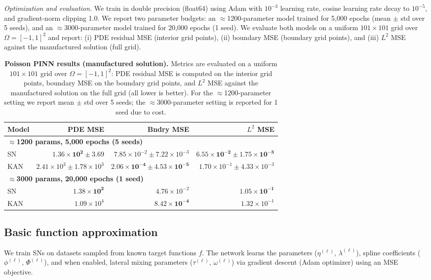 \documentclass{article}
\theoremstyle{plain}
\theoremstyle{definition}
\theoremstyle{remark}
\begin{document}
\emph{Optimization and evaluation.}
We train in double precision (float64) using Adam with $10^{-3}$ learning rate, cosine learning rate decay to $10^{-5}$, and gradient-norm clipping 1.0. We report two parameter budgets: an $\approx$1200-parameter model trained for 5{,}000 epochs (mean $\pm$ std over 5 seeds), and an $\approx$3000-parameter model trained for 20{,}000 epochs (1 seed). We evaluate both models on a uniform $101\times101$ grid over $\Omega=[-1,1]^2$ and report: (i) PDE residual MSE (interior grid points), (ii) boundary MSE (boundary grid points), and (iii) $L^2$ MSE against the manufactured solution (full grid).

\begin{table}[t]
  \centering
  \caption{\textbf{Poisson PINN results (manufactured solution).} Metrics are evaluated on a uniform $101\times101$ grid over $\Omega=[-1,1]^2$: PDE residual MSE is computed on the interior grid points, boundary MSE on the boundary grid points, and $L^2$ MSE against the manufactured solution on the full grid (all lower is better). For the $\approx$1200-parameter setting we report mean $\pm$ std over 5 seeds; the $\approx$3000-parameter setting is reported for 1 seed due to cost.}
  \label{tab:poisson-pinn}
  \begin{tabular}{lrrr}
    \toprule
    Model & PDE MSE & Bndry MSE & $L^2$ MSE \\
    \midrule
    \multicolumn{4}{l}{\textbf{$\approx$1200 params, 5{,}000 epochs (5 seeds)}} \\
    SN  & $\mathbf{1.36\times 10^{2} \pm 3.69}$ & $7.85\times 10^{-2} \pm 7.22\times 10^{-3}$ & $\mathbf{6.55\times 10^{-2} \pm 1.75\times 10^{-3}}$ \\
    KAN & $2.41\times 10^{3} \pm 1.78\times 10^3$ & $\mathbf{2.06\times 10^{-4} \pm 4.53\times 10^{-5}}$ & $1.70\times 10^{-1} \pm 4.33\times 10^{-3}$ \\
    \midrule
    \multicolumn{4}{l}{\textbf{$\approx$3000 params, 20{,}000 epochs (1 seed)}} \\
    SN  & $\mathbf{1.38\times 10^2}$ & $4.76\times 10^{-2}$ & $\mathbf{1.05\times 10^{-1}}$ \\
    KAN & $1.09\times 10^4$ & $\mathbf{8.42\times 10^{-4}}$ & $1.32\times 10^{-1}$ \\
    \bottomrule
  \end{tabular}
\end{table}

\subsection{Basic function approximation}
We train SNs on datasets sampled from known target functions $f$. The network learns the parameters ($\eta^{(\ell)}$, $\lambda^{(\ell)}$), spline coefficients ($\phi^{(\ell)}$, $\Phi^{(\ell)}$), and when enabled, lateral mixing parameters ($\tau^{(\ell)}$, $\omega^{(\ell)}$) via gradient descent (Adam optimizer) using an MSE objective.
\end{document}
